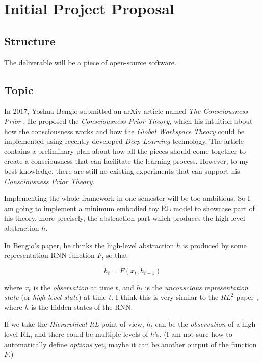 



\section*{Initial Project Proposal}

\subsection*{Structure}
The deliverable will be a piece of open-source software.

\subsection*{Topic}
In 2017, Yoshua Bengio submitted an arXiv article named \emph{The Consciousness Prior} \cite{bengio_consciousness_2019}. He proposed the \emph{Consciousness Prior Theory}, which his intuition about how the consciousness works and how the \emph{Global Workspace Theory} could be implemented using recently developed \emph{Deep Learning} technology. The article contains a preliminary plan about how all the pieces should come together to create a consciousness that can facilitate the learning process. However, to my best knowledge, there are still no existing experiments that can support his \emph{Consciousness Prior Theory}.

Implementing the whole framework in one semester will be too ambitious. So I am going to implement a minimum embodied toy RL model to showcase part of his theory, more precisely, the abstraction part which produces the high-level abstraction $h$.

In Bengio's paper, he thinks the high-level abstraction $h$ is produced by some representation RNN function $F$, so that

\begin{equation*}
    h_t = F(x_t, h_{t-1})
\end{equation*}

where $x_t$ is the \emph{observation} at time $t$, and $h_{t}$ is the \emph{unconscious representation state} (or \emph{high-level state}) at time $t$.
I think this is very similar to the $RL^2$ paper \cite{duan_rl2_2016}, where $h$ is the hidden states of the RNN. 

If we take the \emph{Hierarchical RL} point of view, $h_t$ can be the \emph{observation} of a high-level RL, and there could be multiple levels of $h$'s. (I am not sure how to automatically define \emph{options} yet, maybe it can be another output of the function $F$.)

